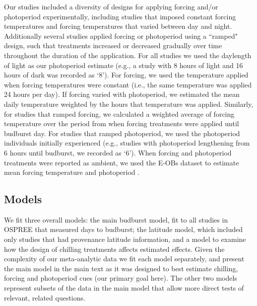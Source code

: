 \documentclass{article}
\begin{document}
Our studies included a diversity of designs for applying forcing and/or photoperiod experimentally, including studies that imposed constant forcing temperatures and forcing temperatures that varied between day and night.  Additionally several studies applied forcing or photoperiod using a ``ramped" design, such that treatments increased or decreased gradually over time throughout the duration of the application. For all studies we used the daylength of light as our photoperiod estimate (e.g., a study with 8 hours of light and 16 hours of dark was recorded as `8'). For forcing, we used the temperature applied when forcing temperatures were constant (i.e., the same temperature was applied 24 hours per day). If forcing varied with photoperiod, we estimated the mean daily temperature weighted by the hours that temperature was applied. Similarly, for studies that ramped forcing, we calculated a weighted average of forcing temperature over the period from when forcing treatments were applied until budburst day. For studies that ramped photoperiod, we used the photoperiod individuals initially experienced (e.g., studies with photoperiod lengthening from 6 hours until budburst, we recorded as `6'). When forcing and photoperiod treatments were reported as ambient, we used the E-OBs dataset to estimate mean forcing temperature and photoperiod \citep{cornes2018}.

\subsection*{Models}

\par We fit three overall models: the main budburst model, fit to all studies in OSPREE that measured days to budburst; the latitude model, which included only studies that had provenance latitude information, and a model to examine how the design of chilling treatments affects estimated effects. Given the complexity of our meta-analytic data we fit each model separately, and present the main model in the main text as it was designed to best estimate chilling, forcing and photoperiod cues (our primary goal here). The other two models represent subsets of the data in the main model that allow more direct tests of relevant, related questions. 
\end{document}
